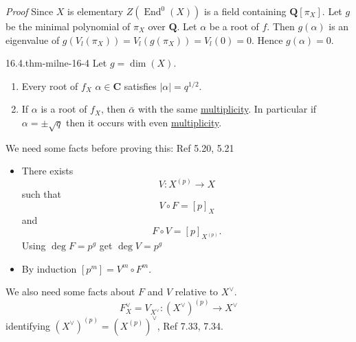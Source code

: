 \documentclass[10pt,]{book}
\makeatletter
\renewcommand*{\proofname}{Proof}
\renewenvironment{proof}[1][\proofname]{\par
  \pushQED{\qed}%
  \normalfont \topsep6\p@\@plus6\p@\relax
  \trivlist
  \item\relax
    {\itshape
    #1\@addpunct{.}}\hspace\labelsep\ignorespaces
}{%
  \popQED\endtrivlist\@endpefalse
}
\numberwithin{equation}{section}
\newcommand{\lb}{[}
\newcommand{\rb}{]}
\newcommand{\QQ}{\mathbf{Q}}
\newcommand{\CC}{\mathbf{C}}
\DeclareMathOperator{\End}{End}
\makeatother
\begin{document}
\begin{proof}\hypertarget{proof-61}{}
\hypertarget{p-364}{}%
Since \(X\) is elementary \(Z(\End^0(X))\) is  a field containing \(\QQ\lb \pi_X\rb\). Let \(g\) be the minimal polynomial of \(\pi_X\) over \(\QQ\). Let \(\alpha\) be a root of \(f\). Then \(g(\alpha)\) is an eigenvalue of \(g(V_l(\pi_X)) = V_l(g(\pi_X)) = V_l(0) = 0\). Hence \(g(\alpha) = 0\).%
\end{proof}
\begin{theorem}{16.4.}{}{thm-milne-16-4}%
\hypertarget{p-365}{}%
Let \(g= \dim (X)\).\leavevmode%
\begin{enumerate}
\item\hypertarget{li-60}{}Every root of \(f_X\) \(\alpha \in \CC\) satisfies \(|\alpha| = q^{1/2}\).%
\item\hypertarget{li-61}{}If \(\alpha\) is  a root of \(f_X\), then \(\bar \alpha\) with the same \hyperref[def-riem-order-vanish]{multiplicity}. In particular if \(\alpha = \pm \sqrt q\) then it occurs with even \hyperref[def-riem-order-vanish]{multiplicity}.%
\end{enumerate}
%
\end{theorem}
\hypertarget{p-366}{}%
We need some facts before proving this: Ref 5.20, 5.21\leavevmode%
\begin{itemize}[label=\textbullet]
\item{}There exists%
\begin{equation*}
V\colon X^{(p)} \to X
\end{equation*}
such that%
\begin{equation*}
V\circ F = [p]_X
\end{equation*}
and%
\begin{equation*}
F \circ V = [p]_{X^{(p)}}\text{.}
\end{equation*}
Using \(\deg F = p^g \)  get \(\deg V = p^g\)%
\item{}By induction \(\lb p^m\rb = V^m \circ F^m\).%
\end{itemize}
%
\par
\hypertarget{p-367}{}%
We also need some facts about \(F\) and \(V\) relative to \(X^\vee\).%
\begin{equation*}
F_X^\vee = V_{X^\vee} \colon (X^\vee)^{(p)} \to X^\vee
\end{equation*}
identifying \((X^\vee)^{(p)} = (X^{(p)})^\vee\), Ref 7.33, 7.34.%
\end{document}
